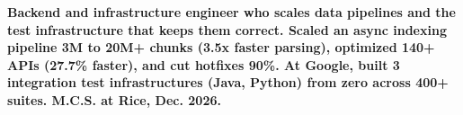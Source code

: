 \item\small{\textbf{Backend and infrastructure engineer who scales data pipelines and the test infrastructure that keeps them correct. Scaled an async indexing pipeline \textbf{3M to 20M+} chunks (\textbf{3.5x} faster parsing), optimized \textbf{140+} APIs (\textbf{27.7\%} faster), and cut hotfixes \textbf{90\%}. At \textbf{Google}, built \textbf{3} integration test infrastructures (\textbf{Java}, \textbf{Python}) from zero across \textbf{400+} suites. M.C.S. at Rice, Dec. 2026.}}%
